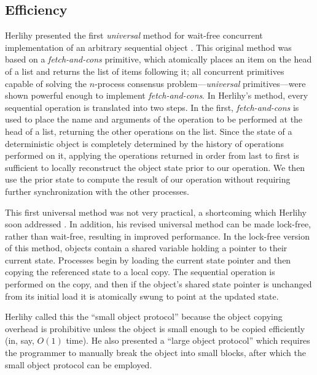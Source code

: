 \documentclass[12pt,oneside]{article}
\newcommand{\punt}[1]{}%
\newcommand{\subsecput}[2]{\subsection{#2}\label{sec:#1}}
\newcommand{\secref}[1]         {Section~\ref{sec:#1}}
\begin{document}
\subsecput{efficiency}{Efficiency}
Herlihy presented the first \emph{universal} method for wait-free
concurrent implementation of an arbitrary sequential object
\cite{Herlihy88,Herlihy91}.  This original method was based on
a \emph{fetch-and-cons} primitive, which atomically places
an item on the head of a list and returns the list of items following
it; all concurrent primitives capable of solving the
$n$-process consensus problem---\emph{universal} primitives---were
shown powerful enough to implement \emph{fetch-and-cons}.
In Herlihy's method, 
every sequential operation is translated into two steps.  In the first,
\emph{fetch-and-cons} is used to place the name and arguments of the
operation to be performed
at the head of a list, returning the other operations on the list.
Since the state
of a deterministic object is completely determined by the history of
operations performed on it, applying the operations returned
in order from last to first is sufficient to locally reconstruct the
object state 
prior to our operation.
We then use the prior state to compute the result of our operation
without requiring further synchronization with the other processes.

This first universal method was not very practical, a shortcoming
which Herlihy soon addressed \cite{Herlihy93}.  In addition, his revised universal
method can be made lock-free, rather than wait-free, resulting in
improved performance.  In the lock-free version of this method,
objects contain a shared variable
holding a pointer to their current state.  Processes begin by loading
the current state pointer and then copying the referenced state to a
local copy.  The sequential operation is performed on the
copy, and then if the object's shared state pointer is unchanged from
its initial load it is atomically swung to point at the updated state.

Herlihy called this the ``small object protocol'' because the object
copying overhead is prohibitive unless the object is small enough to
be copied efficiently (in, say, $O(1)$ time).  He also presented a
``large object protocol'' which requires the programmer to
manually break the object into small blocks, after which the small
object protocol can be employed. 
\punt{ This trouble with large objects is
common to many non-blocking implementations; our solution is presented
in \secref{proposal}.}
\end{document}
